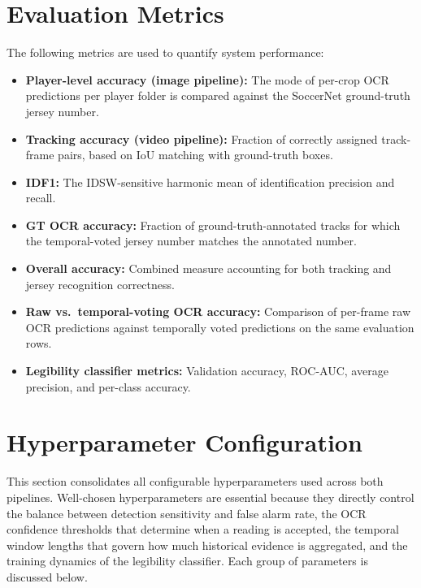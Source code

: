 \section{Evaluation Metrics}
\label{sec:eval-metrics}

The following metrics are used to quantify system performance:

\begin{itemize}[noitemsep]
    \item \textbf{Player-level accuracy (image pipeline):} The mode of
    per-crop OCR predictions per player folder is compared against the
    SoccerNet ground-truth jersey number.
    \item \textbf{Tracking accuracy (video pipeline):} Fraction of
    correctly assigned track-frame pairs, based on IoU matching with
    ground-truth boxes.
    \item \textbf{IDF1:} The IDSW-sensitive harmonic mean of
    identification precision and recall.
    \item \textbf{GT OCR accuracy:} Fraction of ground-truth-annotated
    tracks for which the temporal-voted jersey number matches the
    annotated number.
    \item \textbf{Overall accuracy:} Combined measure accounting for
    both tracking and jersey recognition correctness.
    \item \textbf{Raw vs.\ temporal-voting OCR accuracy:} Comparison
    of per-frame raw OCR predictions against temporally voted
    predictions on the same evaluation rows.
    \item \textbf{Legibility classifier metrics:} Validation accuracy,
    ROC-AUC, average precision, and per-class accuracy.
\end{itemize}

\section{Hyperparameter Configuration}
\label{sec:hyperparameters}

This section consolidates all configurable hyperparameters used across
both pipelines. Well-chosen hyperparameters are essential because they
directly control the balance between detection sensitivity and false
alarm rate, the OCR confidence thresholds that determine when a reading
is accepted, the temporal window lengths that govern how much historical
evidence is aggregated, and the training dynamics of the legibility
classifier. Each group of parameters is discussed below.

